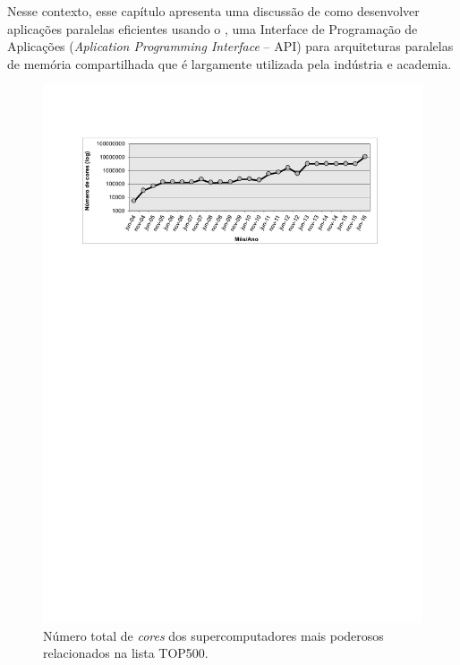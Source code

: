 \documentclass{SBCbookchapter}
\begin{document}
	Nesse contexto, esse capítulo apresenta uma discussão de como
	desenvolver aplicações paralelas eficientes usando o \openmp, uma
	Interface de Programação de Aplicações (\textit{Aplication
	Programming Interface} -- API) para arquiteturas paralelas de
	memória compartilhada que é largamente utilizada pela indústria e
	academia.


	\begin{figure}[t]
		\centering
		\includegraphics[width=13cm, height=!]{img/cores-top500.pdf}
		\caption{Número total de \textit{cores} dos supercomputadores
		mais poderosos relacionados na lista TOP500.}
		\label{fig:top500}
	\end{figure}
\end{document}
